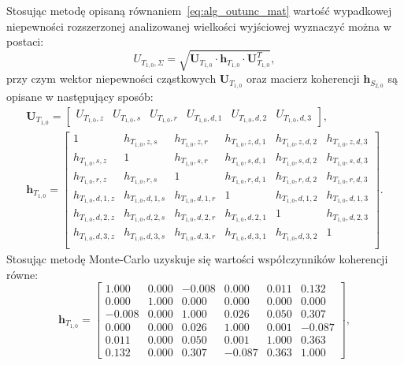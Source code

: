 Stosując metodę opisaną równaniem~\eqref{eq:alg_outunc_mat} wartość wypadkowej niepewności rozszerzonej analizowanej wielkości wyjściowej wyznaczyć można w postaci:
\begin{equation}
U_{T_{1,0},\Sigma} = \sqrt{\mathbf{U}_{T_{1,0}} \cdot \mathbf{h}_{T_{1,0}} \cdot \mathbf{U}_{T_{1,0}}^{T}} \label{eq:sym_partd_output_unc_summul_T_1_0},
\end{equation}
przy czym wektor niepewności cząstkowych $\mathbf{U}_{T_{1,0}}$ oraz macierz koherencji $\mathbf{h}_{S_{2,0}}$ są opisane w następujący sposób:
\begin{gather}
\mathbf{U}_{T_{1,0}} =
\begin{bmatrix}
U_{T_{1,0},z} & U_{T_{1,0},s} & U_{T_{1,0},r} & U_{T_{1,0},d,1} & U_{T_{1,0},d,2} & U_{T_{1,0},d,3}
\end{bmatrix}
\label{eq:sym_partd_output_unc_sumuvect_T_1_0}, \\
\mathbf{h}_{T_{1,0}} =
\begin{bmatrix}
1                 & h_{T_{1,0},z,s}   & h_{T_{1,0},z,r}   & h_{T_{1,0},z,d,1} & h_{T_{1,0},z,d,2} & h_{T_{1,0},z,d,3} \\
h_{T_{1,0},s,z}   & 1                 & h_{T_{1,0},s,r}   & h_{T_{1,0},s,d,1} & h_{T_{1,0},s,d,2} & h_{T_{1,0},s,d,3} \\
h_{T_{1,0},r,z}   & h_{T_{1,0},r,s}   & 1                 & h_{T_{1,0},r,d,1} & h_{T_{1,0},r,d,2} & h_{T_{1,0},r,d,3} \\
h_{T_{1,0},d,1,z} & h_{T_{1,0},d,1,s} & h_{T_{1,0},d,1,r} & 1                 & h_{T_{1,0},d,1,2} & h_{T_{1,0},d,1,3} \\
h_{T_{1,0},d,2,z} & h_{T_{1,0},d,2,s} & h_{T_{1,0},d,2,r} & h_{T_{1,0},d,2,1} & 1                 & h_{T_{1,0},d,2,3} \\
h_{T_{1,0},d,3,z} & h_{T_{1,0},d,3,s} & h_{T_{1,0},d,3,r} & h_{T_{1,0},d,3,1} & h_{T_{1,0},d,3,2} & 1                 \\
\end{bmatrix}
\label{eq:sym_partd_output_unc_sumcoher_T_1_0}.
\end{gather}
Stosując metodę Monte-Carlo uzyskuje się wartości współczynników koherencji równe:
\begin{equation}
\mathbf{h}_{T_{1,0}} =
\begin{bmatrix}
1.000  & 0.000 & -0.008 & 0.000  & 0.011 & 0.132  \\
0.000  & 1.000 & 0.000  & 0.000  & 0.000 & 0.000  \\
-0.008 & 0.000 & 1.000  & 0.026  & 0.050 & 0.307  \\
0.000  & 0.000 & 0.026  & 1.000  & 0.001 & -0.087 \\
0.011  & 0.000 & 0.050  & 0.001  & 1.000 & 0.363  \\
0.132  & 0.000 & 0.307  & -0.087 & 0.363 & 1.000
\end{bmatrix}
\label{eq:sym_partd_output_unc_sumcoherval_T_1_0},
\end{equation}
